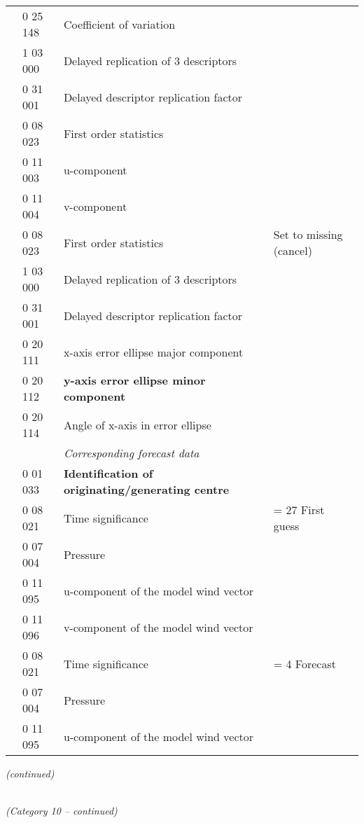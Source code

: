 \begin{longtable}[]{@{}llll@{}}
& 0 25 148 & Coefficient of variation &\tabularnewline
& 1 03 000 & Delayed replication of 3 descriptors &\tabularnewline
& 0 31 001 & Delayed descriptor replication factor &\tabularnewline
& 0 08 023 & First order statistics &\tabularnewline
& 0 11 003 & u-component &\tabularnewline
& 0 11 004 & v-component &\tabularnewline
& 0 08 023 & First order statistics & Set to missing (cancel)\tabularnewline
& 1 03 000 & Delayed replication of 3 descriptors &\tabularnewline
& 0 31 001 & Delayed descriptor replication factor &\tabularnewline
& 0 20 111 & x-axis error ellipse major component &\tabularnewline
& 0 20 112 & \textbf{y-axis error ellipse minor component} &\tabularnewline
& 0 20 114 & Angle of x-axis in error ellipse &\tabularnewline
& & \emph{Corresponding forecast data} &\tabularnewline
& 0 01 033 & \textbf{Identification of originating/generating centre} &\tabularnewline
& 0 08 021 & Time significance & = 27 First guess\tabularnewline
& 0 07 004 & Pressure &\tabularnewline
& 0 11 095 & u-component of the model wind vector &\tabularnewline
& 0 11 096 & v-component of the model wind vector &\tabularnewline
& 0 08 021 & Time significance & = 4 Forecast\tabularnewline
& 0 07 004 & Pressure &\tabularnewline
& 0 11 095 & u-component of the model wind vector &\tabularnewline
\bottomrule
\end{longtable}

\emph{(continued)}

\emph{\\
(Category 10 -- continued)}

